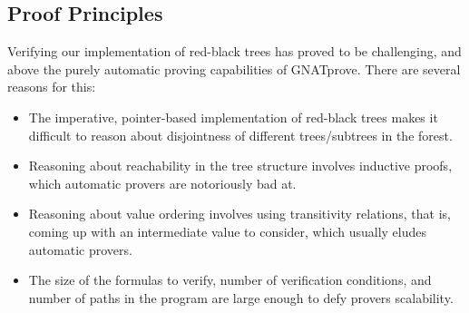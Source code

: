 \documentclass{llncs}
\newcommand{\gnatprove}{GNATprove\xspace}
\begin{document}



\subsection{Proof Principles}


Verifying our implementation of red-black trees has proved to be challenging,
and above the purely automatic proving capabilities of \gnatprove. There
are several reasons for this:

\begin{itemize}
 \item The imperative, pointer-based implementation of red-black trees makes it difficult
 to reason about disjointness of different trees/subtrees in the forest.
 \item Reasoning about reachability in the tree structure involves inductive proofs, which
 automatic provers are notoriously bad at.
 \item Reasoning about value ordering involves using transitivity relations, that is, coming
 up with an intermediate value to consider, which usually eludes automatic provers.
 \item The size of the formulas to verify, number of verification conditions, and number of
 paths in the program are large enough to defy provers scalability.
\end{itemize}
\end{document}
